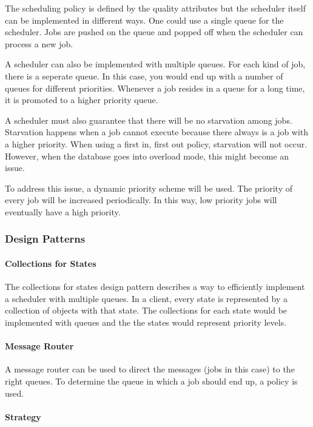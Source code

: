 \npar The scheduling policy is defined by the quality attributes but the
scheduler itself can be implemented in different ways. One could use a single
queue for the scheduler. Jobs are pushed on the queue and popped off when the
scheduler can process a new job. 

\npar A scheduler can also be implemented with multiple queues. For each kind of
job, there is a seperate queue. In this case, you would end up with a number of
queues for different priorities. Whenever a job resides in a queue for a long
time, it is promoted to a higher priority queue. 

\npar A scheduler must also guarantee that there will be no starvation among
jobs. Starvation happens when a job cannot execute because there always is a
job with a higher priority. When using a first in, first out policy, starvation
will not occur. However, when the database goes into overload mode, this might
become an issue. 

\npar To address this issue, a dynamic priority scheme will be used. The
priority of every job will be increased periodically. In this way, low priority
jobs will eventually have a high priority. 

\subsubsection{Design Patterns}
\label{add:it3/patterns}

\paragraph{Collections for States}

\npar The collections for states design pattern describes a way to efficiently
implement a scheduler with multiple queues. In a client, every state is
represented by a collection of objects with that state. The collections for
each state would be implemented with queues and the the states would represent
priority levels.

\paragraph{Message Router}

\npar A message router can be used to direct the messages (jobs in this case) to
the right queues. To determine the queue in which a job should end up, a policy
is used.

\paragraph{Strategy} 

